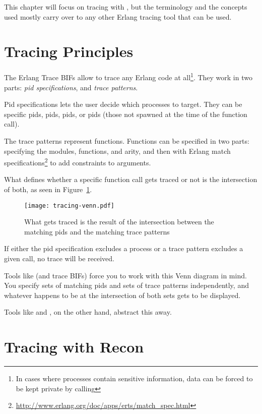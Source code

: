 \documentclass[11pt, oneside]{book}   	%
\begin{document}
This chapter will focus on tracing with , but the terminology and the concepts used mostly carry over to any other Erlang tracing tool that can be used.

\section{Tracing Principles}
\label{sec:tracing-princples}

The Erlang Trace BIFs allow to trace any Erlang code at all\footnote{In cases where processes contain sensitive information, data can be forced to be kept private by calling }. They work in two parts: \emph{pid specifications}, and \emph{trace patterns}.

Pid specifications lets the user decide which processes to target. They can be specific pids,  pids,  pids, or  pids (those not spawned at the time of the function call).

The trace patterns represent functions. Functions can be specified in two parts: specifying the modules, functions, and arity, and then with Erlang match specifications\footnote{\href{http://www.erlang.org/doc/apps/erts/match\_spec.html}{http://www.erlang.org/doc/apps/erts/match\_spec.html}} to add constraints to arguments.

What defines whether a specific function call gets traced or not is the intersection of both, as seen in Figure~\ref{fig:tracing-venn}.

\begin{figure}
  \texttt{[image: tracing-venn.pdf]}%
  \centering%
  \caption{What gets traced is the result of the intersection between the matching pids and the matching trace patterns}%
   \label{fig:tracing-venn}
\end{figure}

If either the pid specification excludes a process or a trace pattern excludes a given call, no trace will be received.

Tools like  (and trace BIFs) force you to work with this Venn diagram in mind. You specify sets of matching pids and sets of trace patterns independently, and whatever happens to be at the intersection of both sets gets to be displayed.

Tools like  and , on the other hand, abstract this away.
\FloatBarrier

\section{Tracing with Recon}
\end{document}
